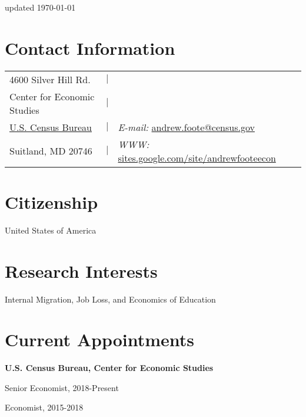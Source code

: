 \documentclass[margin,line]{res}
\newenvironment{list1}{
  \begin{list}{\ding{113}}{%
      \setlength{\itemsep}{0in}
      \setlength{\parsep}{0in} \setlength{\parskip}{0in}
      \setlength{\topsep}{0in} \setlength{\partopsep}{0in} 
      \setlength{\leftmargin}{0.17in}}}{\end{list}}
\begin{document}
 \hfill updated \today{}

\begin{resume}
\section{\sc Contact Information}
\vspace{.02in}
\begin{tabular}{@{}p{2in}p{1.5in}p{4in}}
4600 Silver Hill Rd.             &\hfill $\vert$ &\\            
{Center for Economic Studies} &\hfill $\vert$   &\\    
\href{http://www.census.gov/}{U.S. Census Bureau} &\hfill $\vert$ & {\it E-mail:}  \href{mailto:andrew.foote@census.gov}{andrew.foote@census.gov}\\       
Suitland, MD 20746  &\hfill $\vert$& {\it WWW:} \href{http://sites.google.com/site/andrewfooteecon}{sites.google.com/site/andrewfooteecon} \\     
\end{tabular}

\section{\sc Citizenship} 

United States of America

\vspace{-.1in}
\section{\sc Research Interests}
Internal Migration, Job Loss, and Economics of Education

\section{\sc Current Appointments}

{\bf U.S. Census Bureau, Center for Economic Studies}
\begin{list1}
\item[] Senior Economist, 2018-Present
\item[] Economist, 2015-2018
\end{list1}


\end{resume}
\end{document}
